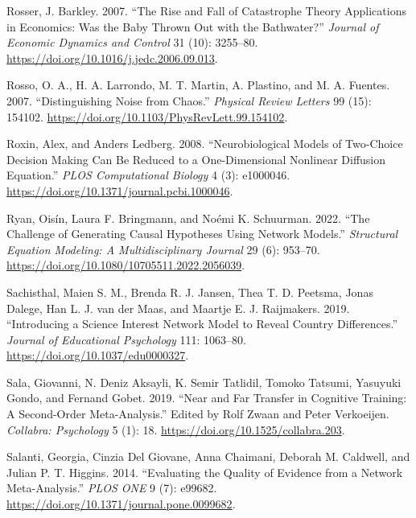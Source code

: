 \documentclass[
  a4paper,
  DIV=11,
  numbers=noendperiod,
  oneside]{scrreprt}
\newlength{\cslhangindent}
\newlength{\cslentryspacingunit} %
\newenvironment{CSLReferences}[2] %
 {%
  \setlength{\parindent}{0pt}
  \ifodd #1
  \let\oldpar\par
  \def\par{\hangindent=\cslhangindent\oldpar}
  \fi
  \setlength{\parskip}{#2\cslentryspacingunit}
 }%
 {}
\begin{document}
\begin{CSLReferences}{1}{0}
\leavevmode{}%
Rosser, J. Barkley. 2007. {``The Rise and Fall of Catastrophe Theory
Applications in Economics: {Was} the Baby Thrown Out with the
Bathwater?''} \emph{Journal of Economic Dynamics and Control} 31 (10):
3255--80. \url{https://doi.org/10.1016/j.jedc.2006.09.013}.

\leavevmode{}%
Rosso, O. A., H. A. Larrondo, M. T. Martin, A. Plastino, and M. A.
Fuentes. 2007. {``Distinguishing Noise from Chaos.''} \emph{Physical
Review Letters} 99 (15): 154102.
\url{https://doi.org/10.1103/PhysRevLett.99.154102}.

\leavevmode{}%
Roxin, Alex, and Anders Ledberg. 2008. {``Neurobiological {Models} of
{Two-Choice Decision Making Can Be Reduced} to a {One-Dimensional
Nonlinear Diffusion Equation}.''} \emph{PLOS Computational Biology} 4
(3): e1000046. \url{https://doi.org/10.1371/journal.pcbi.1000046}.

\leavevmode{}%
Ryan, Oisín, Laura F. Bringmann, and Noémi K. Schuurman. 2022. {``The
{Challenge} of {Generating Causal Hypotheses Using Network Models}.''}
\emph{Structural Equation Modeling: A Multidisciplinary Journal} 29 (6):
953--70. \url{https://doi.org/10.1080/10705511.2022.2056039}.

\leavevmode{}%
Sachisthal, Maien S. M., Brenda R. J. Jansen, Thea T. D. Peetsma, Jonas
Dalege, Han L. J. van der Maas, and Maartje E. J. Raijmakers. 2019.
{``Introducing a Science Interest Network Model to Reveal Country
Differences.''} \emph{Journal of Educational Psychology} 111: 1063--80.
\url{https://doi.org/10.1037/edu0000327}.

\leavevmode{}%
Sala, Giovanni, N. Deniz Aksayli, K. Semir Tatlidil, Tomoko Tatsumi,
Yasuyuki Gondo, and Fernand Gobet. 2019. {``Near and {Far Transfer} in
{Cognitive Training}: {A Second-Order Meta-Analysis}.''} Edited by Rolf
Zwaan and Peter Verkoeijen. \emph{Collabra: Psychology} 5 (1): 18.
\url{https://doi.org/10.1525/collabra.203}.

\leavevmode{}%
Salanti, Georgia, Cinzia Del Giovane, Anna Chaimani, Deborah M.
Caldwell, and Julian P. T. Higgins. 2014. {``Evaluating the Quality of
Evidence from a Network Meta-Analysis.''} \emph{PLOS ONE} 9 (7): e99682.
\url{https://doi.org/10.1371/journal.pone.0099682}.


\end{CSLReferences}
\end{document}
